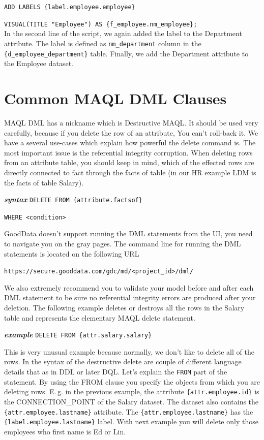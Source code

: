 \documentclass[a4paper, 12pt, titlepage, fleqn]{article}
\begin{document}
\hspace{.9cm}\verb=ADD LABELS {label.employee.employee}=

\hspace{.9cm}\verb=VISUAL(TITLE "Employee") AS {f_employee.nm_employee};=\\

In the second line of the script, we again added the label to the Department attribute. The label is defined as \verb=nm_department= column in the \verb={d_employee_department}= table. Finally, we add the Department attribute to the Employee dataset.

\section{Common MAQL DML Clauses}

MAQL DML has a nickname which is Destructive MAQL. It should be used very carefully, because if you delete the row of an attribute, You can't roll-back it. We have a several use-cases which explain how powerful the delete command is. The most important issue is the referential integrity corruption.
When deleting rows from an attribute table, you should keep in mind, which of the effected rows are directly connected to fact through the facts of table (in our HR example LDM is the facts of table Salary).

\textbf{\emph{syntax}}  \hspace{.9cm}\verb=DELETE FROM {attribute.factsof}=

\hspace{2.2cm}\verb=WHERE <condition>=

GoodData doesn't support running the DML statements from the UI, you need to navigate you on the gray pages. The command line for running the DML statements is located on the following URL

\verb=https://secure.gooddata.com/gdc/md/<project_id>/dml/=

\noindent We also extremely recommend you to validate your model before and after each DML statement to be sure no referential integrity errors are produced after your deletion. The following example deletes or destroys all the rows in the Salary table and represents the elementary MAQL delete statement.

\textbf{\emph{example}}  \hspace{.9cm}\verb=DELETE FROM {attr.salary.salary}=

This is very unusual example because normally, we don't like to delete all of the rows. In the syntax of the destructive delete are couple of different language details that as in DDL or later DQL. Let's explain the \verb=FROM= part of the statement. By using the FROM clause you specify the objects from which you are deleting rows. E.\,g. in the previous example, the attribute \verb={attr.employee.id}= is the CONNECTION\_POINT of the Salary dataset. The dataset also contains the \verb={attr.employee.lastname}= attribute. The \verb={attr.employee.lastname}= has the \verb={label.employee.lastname}= label. With next example you will delete only those employees who first name is Ed or Lin.
\end{document}
